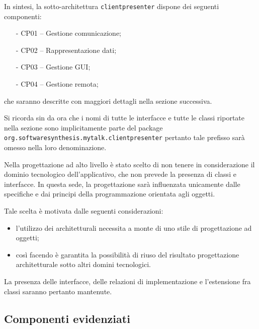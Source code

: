 In sintesi, la sotto-architettura \texttt{clientpresenter} dispone dei seguenti componenti:
\begin{itemize}[noitemsep,nolistsep]
	\item[-] \textsf{CP01 -- Gestione comunicazione};
	\item[-] \textsf{CP02 -- Rappresentazione dati};
	\item[-] \textsf{CP03 -- Gestione GUI};
	\item[-] \textsf{CP04 -- Gestione remota};
\end{itemize}
che saranno descritte con maggiori dettagli nella sezione successiva.

Si ricorda sin da ora che i nomi di tutte le interfacce e tutte le classi riportate nella sezione sono implicitamente parte del package \texttt{org.softwaresynthesis.mytalk.clientpresenter} pertanto tale prefisso sarà omesso nella loro denominazione.

Nella progettazione ad alto livello è stato scelto di non tenere in considerazione il dominio tecnologico dell'applicativo, che non prevede la presenza di classi e interfacce. In questa sede, la progettazione sarà influenzata unicamente dalle specifiche e dai principi della programmazione orientata agli oggetti.

Tale scelta è motivata dalle seguenti considerazioni:
\begin{itemize}
   \item l'utilizzo dei  architetturali necessita a monte di uno stile di progettazione ad oggetti;
   \item così facendo è garantita la possibilità di riuso del risultato progettazione architetturale sotto altri domini tecnologici.
\end{itemize}

La presenza delle interfacce, delle relazioni di implementazione e l'estensione fra classi saranno pertanto mantenute.

\subsection{Componenti evidenziati}

